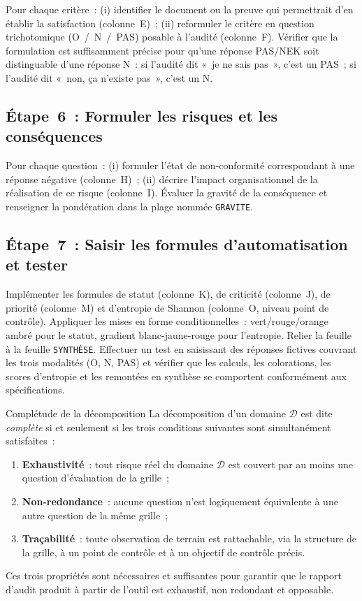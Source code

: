 Pour chaque critère~: (i) identifier le document ou la preuve qui permettrait
d'en établir la satisfaction (colonne~E)~; (ii) reformuler le critère en
question trichotomique (O~/~N~/~PAS) posable à l'audité (colonne~F). Vérifier
que la formulation est suffisamment précise pour qu'une réponse PAS/NEK soit
distinguable d'une réponse N~: si l'audité dit «~je ne sais pas~», c'est un
PAS~; si l'audité dit «~non, ça n'existe pas~», c'est un N.

\subsection{Étape~6~: Formuler les risques et les conséquences}

Pour chaque question~: (i) formuler l'état de non-conformité correspondant à une
réponse négative (colonne~H)~; (ii) décrire l'impact organisationnel de la
réalisation de ce risque (colonne~I). Évaluer la gravité de la conséquence et
renseigner la pondération dans la plage nommée \texttt{GRAVITE}.

\subsection{Étape~7~: Saisir les formules d'automatisation et tester}

Implémenter les formules de statut (colonne~K), de criticité (colonne~J),
de priorité (colonne~M) et d'entropie de Shannon (colonne~O, niveau point de
contrôle). Appliquer les mises en forme conditionnelles~: vert/rouge/orange
ambré pour le statut, gradient blanc-jaune-rouge pour l'entropie. Relier la
feuille à la feuille \texttt{SYNTHÈSE}. Effectuer un test en saisissant des
réponses fictives couvrant les trois modalités (O, N, PAS) et vérifier que les
calculs, les colorations, les scores d'entropie et les remontées en synthèse se
comportent conformément aux spécifications.

\begin{boiteTheoreme}{Complétude de la décomposition}
La décomposition d'un domaine $\mathcal{D}$ est dite \emph{complète} si et
seulement si les trois conditions suivantes sont simultanément satisfaites~:

\begin{enumerate}
  \item \textbf{Exhaustivité}~: tout risque réel du domaine $\mathcal{D}$ est
        couvert par au moins une question d'évaluation de la grille~;
  \item \textbf{Non-redondance}~: aucune question n'est logiquement équivalente
        à une autre question de la même grille~;
  \item \textbf{Traçabilité}~: toute observation de terrain est rattachable,
        via la structure de la grille, à un point de contrôle et à un objectif
        de contrôle précis.
\end{enumerate}

Ces trois propriétés sont nécessaires et suffisantes pour garantir que le
rapport d'audit produit à partir de l'outil est exhaustif, non redondant et
opposable.
\end{boiteTheoreme}
